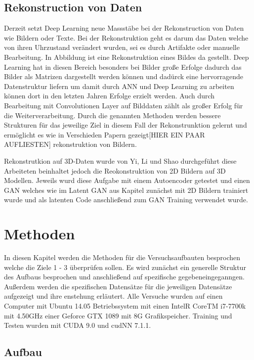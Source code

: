 \documentclass{llncs}
\begin{document}
\subsection{Rekonstruction von Daten}

Derzeit setzt Deep Learning neue Massstäbe bei der Rekonstruction von Daten wie Bildern oder Texte. Bei der Rekonstruktion geht es darum das Daten welche von ihren Uhrzustand verändert wurden, sei es durch Artifakte oder manuelle Bearbeitung. In Abbildung ist eine Rekonstruktion eines Bildes da gestellt. Deep Learning hat in diesen Bereich besonders bei Bilder große Erfolge dadurch das Bilder als Matrizen dargestellt werden können und dadürck eine hervorragende Datenstruktur liefern um damit durch ANN und Deep Learning zu arbeiten können dort in den letzten Jahren Erfolge erzielt werden. Auch durch Bearbeitung mit Convolutionen Layer auf Bilddaten zählt als großer Erfolg für die Weiterverarbeitung. Durch die genannten Methoden werden bessere Strukturen für das jeweilige Ziel in diesem Fall der Rekonstrunktion gelernt und ermöglicht es wie in Verschieden Papern gezeigt[HIER EIN PAAR AUFLIESTEN] rekonstruktion von Bildern.

Rekonstrutkion auf 3D-Daten wurde von Yi, Li und Shao \cite{3d_recon} durchgeführt diese Arbeiteten beinhaltet jedoch die Reokonstruktion von 2D Bildern auf 3D Modellen. Jeweils wurd diese Aufgabe mit einem Autoencoder getestet und einen GAN welches wie im Latent GAN aus Kapitel zunächst mit 2D Bildern trainiert wurde und als latenten Code anschließend zum GAN Training verwendet wurde. 

\section{Methoden}
In diesen Kapitel werden die Methoden für die Versuchsaufbauten besprochen welche die Ziele 1 - 3 überprüfen sollen. Es wird zunächst ein generelle Struktur des Aufbaus besprochen und anschließend auf spezifische gegebeneingeganngen. Außerdem werden die spezifischen Datensätze für die jeweiligen Datensätze aufgezeigt und ihre enstehung erläutert. Alle Versuche wurden auf einen Computer mit Ubuntu 14.05 Betriebssystem mit einen IntelR CoreTM i7-7700k mit 4.50GHz einer Geforce GTX 1089 mit 8G Grafikspeicher. Training und Testen wurden mit CUDA 9.0 und cudNN 7.1.1.

\subsection{Aufbau}
\end{document}
